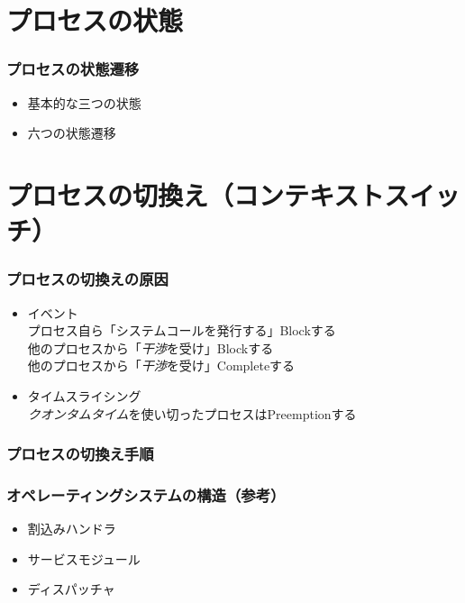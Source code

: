 \documentclass[unicode]{beamer}                   %
\begin{document}
\section{プロセスの状態}
\begin{frame}
  \frametitle{プロセスの状態遷移}
  \begin{itemize}
    \item 基本的な三つの状態
    \item 六つの状態遷移
  \end{itemize}
\end{frame}

\section{プロセスの切換え（コンテキストスイッチ）}
\begin{frame}
  \frametitle{プロセスの切換えの原因}
  \begin{itemize}
    \item イベント\\
      プロセス自ら「システムコールを発行する」Blockする \\
      他のプロセスから「\emph{干渉}を受け」Blockする    \\
      他のプロセスから「\emph{干渉}を受け」Completeする
      \vfill
    \item タイムスライシング\\
      \emph{クオンタムタイム}を使い切ったプロセスはPreemptionする
  \end{itemize}
  \vfill
\end{frame}

\begin{frame}
  \frametitle{プロセスの切換え手順}
\end{frame}

\begin{frame}
  \frametitle{オペレーティングシステムの構造（参考）}
  \begin{itemize}
    \item 割込みハンドラ
    \item サービスモジュール
    \item ディスパッチャ
  \end{itemize}
\end{frame}
\end{document}
